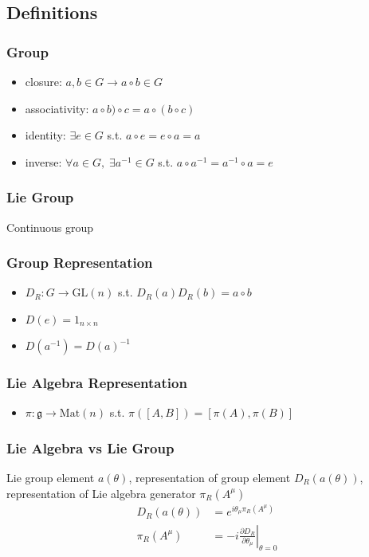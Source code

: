 \documentclass[../main.tex]{subfiles}
\begin{document}
\subsection{Definitions}
\subsubsection{Group}
\begin{itemize}
\item closure: $a,b\in G \rightarrow a\circ b \in G$
\item associativity: $a\circ b)\circ c=a\circ(b\circ c)$
\item identity: $\exists e\in G$ s.t. $a\circ e=e\circ a = a$
\item inverse: $\forall a\in G,\; \exists a^{-1}\in G$ s.t. $a\circ a^{-1}=a^{-1}\circ a=e$
\end{itemize}

\subsubsection{Lie Group}
Continuous group

\subsubsection{Group Representation}
\begin{itemize}
\item $D_R:G\rightarrow \text{GL}(n)$ s.t. $D_R(a)D_R(b)=a\circ b$
\item $D(e)=1_{n\times n}$
\item $D(a^{-1})=D(a)^{-1}$
\end{itemize}

\subsubsection{Lie Algebra Representation}
\begin{itemize}
\item $\pi:\mathfrak{g} \rightarrow \text{Mat}(n)$ s.t. $\pi([A,B])=[\pi(A),\pi(B)]$
\end{itemize}

\subsubsection{Lie Algebra vs Lie Group}
Lie group element $a(\theta)$, representation of group element $D_R(a(\theta))$, representation of Lie algebra generator $\pi_R(A^\mu)$
\begin{align}
D_R(a(\theta))&=e^{i\theta_\mu\pi_R(A^\mu)}\\
\pi_R(A^\mu)&=-i\left.\frac{\partial D_R}{\partial\theta_\mu}\right|_{\theta=0}
\end{align}
\end{document}
